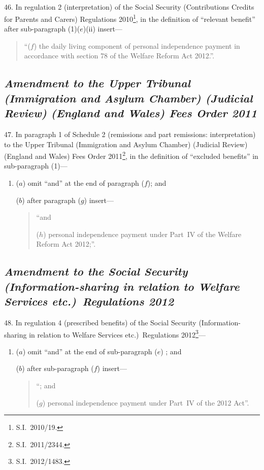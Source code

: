 \documentclass[12pt,a4paper]{article}
\begin{document}
\subsection*{\itshape{}}

46.  In regulation 2 (interpretation) of the Social Security (Contributions Credits for Parents and Carers) Regulations 2010\footnote{S.I.~2010/19.}, in the definition of “relevant benefit” after sub-paragraph (1)($e$)(ii)  insert—
\begin{quotation}
“($f$) the daily living component of personal independence payment in accordance with section 78 of the Welfare Reform Act 2012.”.
\end{quotation}

\subsection*{\itshape\sloppy Amendment to the Upper Tribunal (Immigration and Asylum Chamber) (Judicial Review) (England and Wales) Fees Order 2011}

47.  In paragraph 1 of Schedule 2 (remissions and part remissions: interpretation) to the Upper Tribunal (Immigration and Asylum Chamber) (Judicial Review) (England and Wales) Fees Order 2011\footnote{S.I.~2011/2344.}, in the definition of “excluded benefits” in sub-paragraph (1)—
\begin{enumerate}\item[]
($a$) omit “and” at the end of paragraph ($f$); and

($b$) after paragraph ($g$)  insert—
\begin{quotation}
“and

($h$) personal independence payment under Part~IV of the Welfare Reform Act 2012;”.
\end{quotation}
\end{enumerate}

\subsection*{\itshape Amendment to the Social Security (Information-\hspace{0pt}sharing in relation to Welfare Services etc.)\ Regulations 2012}

48.  In regulation 4 (prescribed benefits) of the Social Security (Information-sharing in relation to Welfare Services etc.)\ Regulations 2012\footnote{S.I.~2012/1483.}—
\begin{enumerate}\item[]
($a$) omit “and” at the end of sub-paragraph ($e$) ; and

($b$) after sub-paragraph ($f$)  insert—
\begin{quotation}
“; and

($g$) personal independence payment under Part~IV of the 2012 Act”.
\end{quotation}
\end{enumerate}
\end{document}

